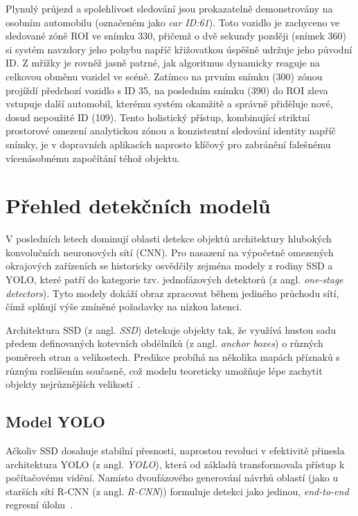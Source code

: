 \documentclass[male,czech,api_bc]{kitheses}
\begin{document}
Plynulý průjezd a spolehlivost sledování jsou prokazatelně demonstrovány na osobním automobilu (označeném jako \textit{car ID:61}). Toto vozidlo je zachyceno ve sledované zóně \acs{ROI} ve snímku 330, přičemž o dvě sekundy později (snímek 360) si systém navzdory jeho pohybu napříč křižovatkou úspěšně udržuje jeho původní \acs{ID}. Z mřížky je rovněž jasně patrné, jak algoritmus dynamicky reaguje na celkovou obměnu vozidel ve scéně. Zatímco na prvním snímku (300) zónou projíždí předchozí vozidlo s \acs{ID} 35, na posledním snímku (390) do \acs{ROI} zleva vstupuje další automobil, kterému systém okamžitě a správně přiděluje nové, dosud nepoužité \acs{ID} (109). Tento holistický přístup, kombinující striktní prostorové omezení analytickou zónou a konzistentní sledování identity napříč snímky, je v dopravních aplikacích naprosto klíčový pro zabránění falešnému vícenásobnému započítání téhož objektu.

\section{Přehled detekčních modelů}
V posledních letech dominují oblasti detekce objektů architektury hlubokých konvolučních neuronových sítí (CNN). Pro nasazení na výpočetně omezených okrajových zařízeních se historicky osvědčily zejména modely z rodiny SSD a YOLO, které patří do kategorie tzv. jednofázových detektorů (z angl. \textit{one-stage detectors}). Tyto modely dokáží obraz zpracovat během jediného průchodu sítí, čímž splňují výše zmíněné požadavky na nízkou latenci.

Architektura \acs{SSD} (z angl. \textit{\acl{SSD}}) detekuje objekty tak, že využívá hustou sadu předem definovaných kotevních obdélníků (z angl. \textit{anchor boxes}) o různých poměrech stran a velikostech. Predikce probíhá na několika mapách příznaků s různým rozlišením současně, což modelu teoreticky umožňuje lépe zachytit objekty nejrůznějších velikostí~\cite{szeliski_computer_vision}.


\subsection{Model YOLO}
Ačkoliv SSD dosahuje stabilní přesnosti, naprostou revoluci v efektivitě přinesla architektura \acs{YOLO} (z angl. \textit{\acl{YOLO}}), která od základů transformovala přístup k počítačovému vidění. Namísto dvoufázového generování návrhů oblastí (jako u starších sítí \acs{R-CNN} (z angl. \textit{\acl{R-CNN}})) formuluje detekci jako jedinou, \textit{end-to-end} regresní úlohu~\cite{redmon_yolo_2016}.
\end{document}

